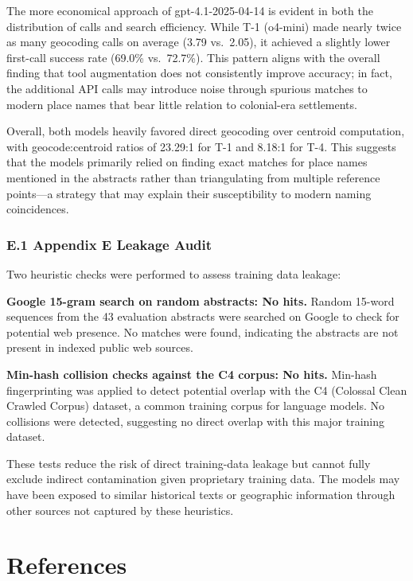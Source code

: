 \documentclass[
  10pt,
  twocolumn]{article}
\begin{document}
The more economical approach of gpt-4.1-2025-04-14 is evident in both
the distribution of calls and search efficiency. While T-1 (o4-mini)
made nearly twice as many geocoding calls on average (3.79 vs.~2.05), it
achieved a slightly lower first-call success rate (69.0\% vs.~72.7\%).
This pattern aligns with the overall finding that tool augmentation does
not consistently improve accuracy; in fact, the additional API calls may
introduce noise through spurious matches to modern place names that bear
little relation to colonial-era settlements.

Overall, both models heavily favored direct geocoding over centroid
computation, with geocode:centroid ratios of 23.29:1 for T-1 and 8.18:1
for T-4. This suggests that the models primarily relied on finding exact
matches for place names mentioned in the abstracts rather than
triangulating from multiple reference points---a strategy that may
explain their susceptibility to modern naming coincidences.

\subsubsection{E.1 Appendix E Leakage
Audit}\label{e.1-appendix-e-leakage-audit}

Two heuristic checks were performed to assess training data leakage:

\textbf{Google 15-gram search on random abstracts: No hits.} Random
15-word sequences from the 43 evaluation abstracts were searched on
Google to check for potential web presence. No matches were found,
indicating the abstracts are not present in indexed public web sources.

\textbf{Min-hash collision checks against the C4 corpus: No hits.}
Min-hash fingerprinting was applied to detect potential overlap with the
C4 (Colossal Clean Crawled Corpus) dataset, a common training corpus for
language models. No collisions were detected, suggesting no direct
overlap with this major training dataset.

These tests reduce the risk of direct training-data leakage but cannot
fully exclude indirect contamination given proprietary training data.
The models may have been exposed to similar historical texts or
geographic information through other sources not captured by these
heuristics.

\section*{References}\label{references}
\end{document}
